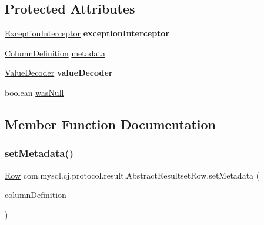 \subsection*{Protected Attributes}
\begin{DoxyCompactItemize}
\item 
\mbox{\label{classcom_1_1mysql_1_1cj_1_1protocol_1_1result_1_1_abstract_resultset_row_a50c0daccb2e9e7e2445af4a09d6fb9d0}} 
\mbox{\hyperlink{interfacecom_1_1mysql_1_1cj_1_1exceptions_1_1_exception_interceptor}{Exception\+Interceptor}} {\bfseries exception\+Interceptor}
\item 
\mbox{\hyperlink{interfacecom_1_1mysql_1_1cj_1_1protocol_1_1_column_definition}{Column\+Definition}} \mbox{\hyperlink{classcom_1_1mysql_1_1cj_1_1protocol_1_1result_1_1_abstract_resultset_row_aa256b7951746cbcc3979d7474fa50c84}{metadata}}
\item 
\mbox{\label{classcom_1_1mysql_1_1cj_1_1protocol_1_1result_1_1_abstract_resultset_row_a62b113b0142a35b7962695b43b5b8e22}} 
\mbox{\hyperlink{interfacecom_1_1mysql_1_1cj_1_1protocol_1_1_value_decoder}{Value\+Decoder}} {\bfseries value\+Decoder}
\item 
boolean \mbox{\hyperlink{classcom_1_1mysql_1_1cj_1_1protocol_1_1result_1_1_abstract_resultset_row_a26e909a488abbe6e233b88a5f7e72dab}{was\+Null}}
\end{DoxyCompactItemize}


\subsection{Member Function Documentation}
\mbox{\label{classcom_1_1mysql_1_1cj_1_1protocol_1_1result_1_1_abstract_resultset_row_a9f17330b25a79a752370017c78d73d08}} 
\subsubsection{\texorpdfstring{set\+Metadata()}{setMetadata()}}
{\footnotesize\ttfamily \mbox{\hyperlink{interfacecom_1_1mysql_1_1cj_1_1result_1_1_row}{Row}} com.\+mysql.\+cj.\+protocol.\+result.\+Abstract\+Resultset\+Row.\+set\+Metadata (\begin{DoxyParamCaption}\item[{\mbox{\hyperlink{interfacecom_1_1mysql_1_1cj_1_1protocol_1_1_column_definition}{Column\+Definition}}}]{column\+Definition }\end{DoxyParamCaption})}

